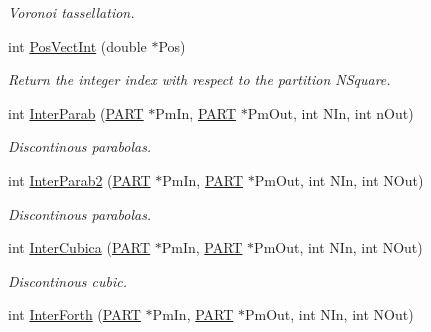 \begin{DoxyCompactItemize}
\begin{DoxyCompactList}\small\item\em Voronoi tassellation. \end{DoxyCompactList}\item 
int \hyperlink{classVarData_a0f777b6a01b8a40aed0245854cda4e58}{Pos\+Vect\+Int} (double $\ast$Pos)\hypertarget{classVarData_a0f777b6a01b8a40aed0245854cda4e58}{}\label{classVarData_a0f777b6a01b8a40aed0245854cda4e58}

\begin{DoxyCompactList}\small\item\em Return the integer index with respect to the partition N\+Square. \end{DoxyCompactList}\item 
int \hyperlink{classVarData_ac526ef733a76db5259feea1b985eeeaf}{Inter\+Parab} (\hyperlink{structPART}{P\+A\+RT} $\ast$Pm\+In, \hyperlink{structPART}{P\+A\+RT} $\ast$Pm\+Out, int N\+In, int n\+Out)\hypertarget{classVarData_ac526ef733a76db5259feea1b985eeeaf}{}\label{classVarData_ac526ef733a76db5259feea1b985eeeaf}

\begin{DoxyCompactList}\small\item\em Discontinous parabolas. \end{DoxyCompactList}\item 
int \hyperlink{classVarData_a75e10cd80f78c0d544133f954c194a00}{Inter\+Parab2} (\hyperlink{structPART}{P\+A\+RT} $\ast$Pm\+In, \hyperlink{structPART}{P\+A\+RT} $\ast$Pm\+Out, int N\+In, int N\+Out)\hypertarget{classVarData_a75e10cd80f78c0d544133f954c194a00}{}\label{classVarData_a75e10cd80f78c0d544133f954c194a00}

\begin{DoxyCompactList}\small\item\em Discontinous parabolas. \end{DoxyCompactList}\item 
int \hyperlink{classVarData_a795082ee073645d47521f76466f7ed8a}{Inter\+Cubica} (\hyperlink{structPART}{P\+A\+RT} $\ast$Pm\+In, \hyperlink{structPART}{P\+A\+RT} $\ast$Pm\+Out, int N\+In, int N\+Out)\hypertarget{classVarData_a795082ee073645d47521f76466f7ed8a}{}\label{classVarData_a795082ee073645d47521f76466f7ed8a}

\begin{DoxyCompactList}\small\item\em Discontinous cubic. \end{DoxyCompactList}\item 
int \hyperlink{classVarData_a0a052e0873439d07b96b568cbf9dd779}{Inter\+Forth} (\hyperlink{structPART}{P\+A\+RT} $\ast$Pm\+In, \hyperlink{structPART}{P\+A\+RT} $\ast$Pm\+Out, int N\+In, int N\+Out)\hypertarget{classVarData_a0a052e0873439d07b96b568cbf9dd779}{}\label{classVarData_a0a052e0873439d07b96b568cbf9dd779}


\end{DoxyCompactItemize}
